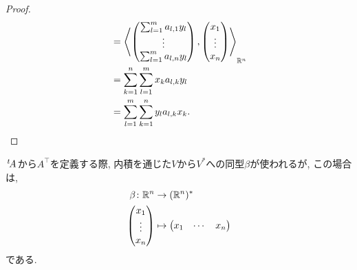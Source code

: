 \begin{proof}
\begin{align*}
    &=\Braket{\begin{pmatrix}\sum_{l=1}^{m}a_{l,1}y_l\\\vdots\\\sum_{l=1}^{m}a_{l,n}y_l\end{pmatrix},\begin{pmatrix}x_1\\\vdots\\x_n\end{pmatrix}}_{\mathbb{R}^n}\\
    &=\sum_{k=1}^n\sum_{l=1}^{m}x_ka_{l,k}y_l\\
    &=\sum_{l=1}^{m}\sum_{k=1}^ny_la_{l,k}x_k.
  \end{align*}
\end{proof}

\begin{remark}
  $\left.^{t}\!A\right.$から$A^\top$を定義する際,
  内積を通じた$V$から$V^\ast$への同型$\beta$が使われるが,
  この場合は,
  \begin{align*}
    \beta\colon \mathbb{R}^n &\to (\mathbb{R}^n)^\ast \\
    \begin{pmatrix}x_1\\\vdots\\x_n\end{pmatrix}
      &\mapsto
      \begin{pmatrix}x_1&\cdots&x_n\end{pmatrix}
  \end{align*}
  である.
\end{remark}

